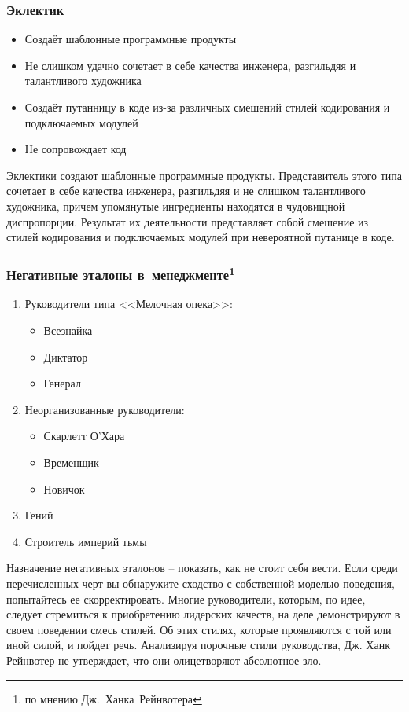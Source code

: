 \documentclass{../industrial-development}
\begin{document}
{\begin{frame} \frametitle{Эклектик}
	\begin{itemize}
		\item Создаёт шаблонные программные продукты
		\item Не слишком удачно сочетает в себе качества инженера, разгильдяя и  талантливого художника 
		\item Создаёт путанницу в коде из-за различных смешений стилей кодирования и подключаемых модулей
		\item Не сопровождает код
	\end{itemize}
\end{frame}
\lecturenotes
Эклектики создают шаблонные программные продукты. Представитель этого типа сочетает в себе качества инженера, разгильдяя и не слишком талантливого художника, причем упомянутые ингредиенты находятся в чудовищной диспропорции. Результат их деятельности представляет собой смешение из стилей кодирования и подключаемых модулей при невероятной путанице в коде. 

\begin{frame} \frametitle{Негативные эталоны в~менеджменте\footnote[1]{по мнению Дж.~Ханка~Рейнвотера}}
	\begin{enumerate}
\item Руководители типа <<Мелочная опека>>:
		 \begin{itemize}
                     \item Всезнайка
 		 \item Диктатор
 		 \item Генерал
		\end{itemize} 
\item Неорганизованные руководители:	
		 \begin{itemize}
                     \item Скарлетт О'Хара
		 \item Временщик
 		\item Новичок
		\end{itemize} 
\item Гений
\item Строитель империй тьмы
\end{enumerate}
\end{frame}
\lecturenotes
Назначение негативных эталонов – показать, как не стоит себя вести. Если среди
перечисленных черт вы обнаружите сходство с собственной моделью поведения,
попытайтесь ее скорректировать. 
Многие руководители, которым, по идее, следует стремиться к приобретению лидерских качеств, на деле демонстрируют в своем поведении смесь стилей. Об этих стилях, которые проявляются с той или иной силой, и пойдет речь. Анализируя порочные стили руководства, Дж. Ханк Рейнвотер не утверждает, что они олицетворяют абсолютное зло. 

}
\end{document}
